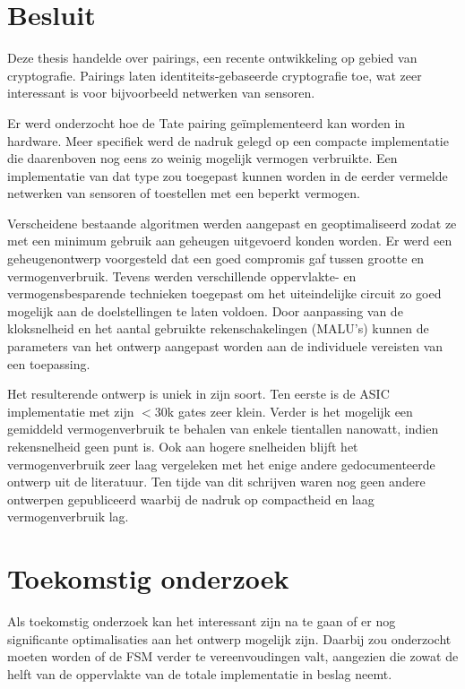 
\section{Besluit}

Deze thesis handelde over pairings, een recente ontwikkeling op gebied van cryptografie. Pairings laten identiteits-gebaseerde cryptografie toe, wat zeer interessant is voor bijvoorbeeld netwerken van sensoren.

Er werd onderzocht hoe de Tate pairing ge\"implementeerd kan worden in hardware. Meer specifiek werd de nadruk gelegd op een compacte implementatie die daarenboven nog eens zo weinig mogelijk vermogen verbruikte. Een implementatie van dat type zou toegepast kunnen worden in de eerder vermelde netwerken van sensoren of toestellen met een beperkt vermogen.

Verscheidene bestaande algoritmen werden aangepast en geoptimaliseerd zodat ze met een minimum gebruik aan geheugen uitgevoerd konden worden. Er werd een geheugenontwerp voorgesteld dat een goed compromis gaf tussen grootte en vermogenverbruik. Tevens werden verschillende oppervlakte- en vermogensbesparende technieken toegepast om het uiteindelijke circuit zo goed mogelijk aan de doelstellingen te laten voldoen. Door aanpassing van de kloksnelheid en het aantal gebruikte rekenschakelingen (MALU's) kunnen de parameters van het ontwerp aangepast worden aan de individuele vereisten van een toepassing.

Het resulterende ontwerp is uniek in zijn soort. Ten eerste is de ASIC implementatie met zijn $<$30k gates zeer klein. Verder is het mogelijk een gemiddeld vermogenverbruik te behalen van enkele tientallen nanowatt, indien rekensnelheid geen punt is. Ook aan hogere snelheiden blijft het vermogenverbruik zeer laag vergeleken met het enige andere gedocumenteerde ontwerp uit de literatuur. Ten tijde van dit schrijven waren nog geen andere ontwerpen gepubliceerd waarbij de nadruk op compactheid en laag vermogenverbruik lag.

\section{Toekomstig onderzoek}

Als toekomstig onderzoek kan het interessant zijn na te gaan of er nog significante optimalisaties aan het ontwerp mogelijk zijn. Daarbij zou onderzocht moeten worden of de FSM verder te vereenvoudingen valt, aangezien die zowat de helft van de oppervlakte van de totale implementatie in beslag neemt.

